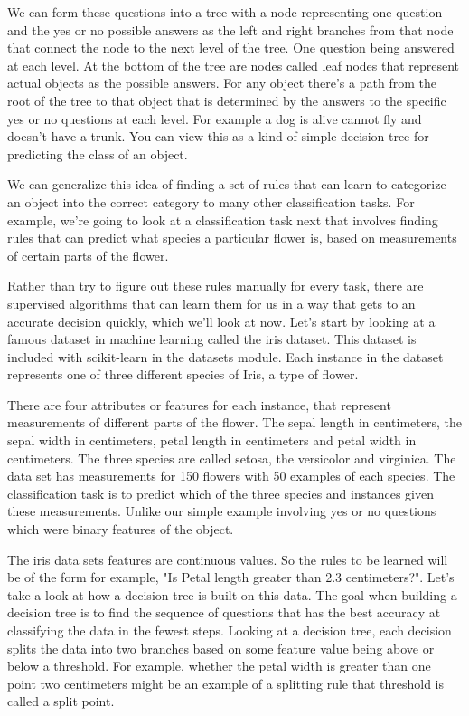 \begin{multicols}{2}
We can form these questions into a tree with a node representing one question and the yes or no possible answers as the left and right branches from that node that connect the node to the next level of the tree. One question being answered at each level. At the bottom of the tree are nodes called leaf nodes that represent actual objects as the possible answers. For any object there's a path from the root of the tree to that object that is determined by the answers to the specific yes or no questions at each level. For example a dog is alive cannot fly and doesn't have a trunk. You can view this as a kind of simple decision tree for predicting the class of an object. 

We can generalize this idea of finding a set of rules that can learn to categorize an object into the correct category to many other classification tasks. For example, we're going to look at a classification task next that involves finding rules that can predict what species a particular flower is, based on measurements of certain parts of the flower. 

Rather than try to figure out these rules manually for every task, there are supervised algorithms that can learn them for us in a way that gets to an accurate decision quickly, which we'll look at now. Let's start by looking at a famous dataset in machine learning called the iris dataset. This dataset is included with scikit-learn in the datasets module. Each instance in the dataset represents one of three different species of Iris, a type of flower. 

There are four attributes or features for each instance, that represent measurements of different parts of the flower. The sepal length in centimeters, the sepal width in centimeters, petal length in centimeters and petal width in centimeters. The three species are called setosa, the versicolor and virginica. The data set has measurements for 150 flowers with 50 examples of each species. The classification task is to predict which of the three species and instances given these measurements. Unlike our simple example involving yes or no questions which were binary features of the object. 

The iris data sets features are continuous values. So the rules to be learned will be of the form for example, "Is Petal length greater than 2.3 centimeters?". Let's take a look at how a decision tree is built on this data. The goal when building a decision tree is to find the sequence of questions that has the best accuracy at classifying the data in the fewest steps. Looking at a decision tree, each decision splits the data into two branches based on some feature value being above or below a threshold. For example, whether the petal width is greater than one point two centimeters might be an example of a splitting rule that threshold is called a split point. 


\end{multicols}
